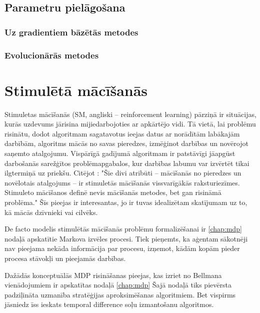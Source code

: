 \documentclass{ludis} %
\begin{document}
\section{Parametru pielāgošana}
\subsection{Uz gradientiem bāzētās metodes}
\subsection{Evolucionārās metodes}

\chapter{Stimulētā mācīšanās} \label{chap:stim}
Stimuletas mācīšanās (SM, angliski -- reinforcement learning) pārziņā ir situācijas, kurās uzdevums jārisina mijiedarbojoties ar apkārtējo vidi. 
Tā vietā, lai problēmu risinātu, dodot algoritmam sagatavotus ieejas datus ar norādītām labākajām darbībām, algoritms mācās no savas pieredzes, izmēģinot darbības un novērojot saņemto atalgojumu.
Vispārīgā gadījumā algoritmam ir patstāvīgi jāapgūst darbošanās sarežģītos problēmapgabalos, kur darbības labumu var izvērtēt tikai ilgtermiņā uz priekšu.
Citējot \citet{Barto}: "Šie divi atribūti -- mācīšanās no pieredzes un novēlotais atalgojums -- ir stimuletās mācīšanās vissvarīgākās raksturiezīmes.
Stimuleto mācīšanos definē nevis mācīšanās metodes, bet gan risināmā problēma."
Šīs pieejas ir interesantas, jo ir tuvas idealizētam skatījumam uz to, kā mācās dzīvnieki vai cilvēks.

De facto modelis stimulētās mācīšanās problēmu formalizēšanai ir \ref{chap:mdp} nodaļā apskatītie Markova izvēles procesi.
Tiek pieņemts, ka aģentam sākotnēji nav pieejama nekāda informācija par procesu, izņemot, kādām kopām pieder procesa stāvokļi un pieejamās darbības.

Dažādās konceptuālās MDP risināšanas pieejas, kas izriet no Bellmana vienādojumiem ir apskatītas nodaļā \ref{chap:mdp}
Šajā nodaļā tiks pievērsta padziļināta uzmanība stratēģijas aproksimēšanas algoritmiem.
Bet vispirms jāsniedz īss ieskats temporal difference soļu izmantošanu algoritmos.
\end{document}
